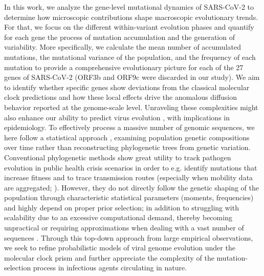 In this work, we analyze the gene-level mutational dynamics of SARS-CoV-2 to determine how microscopic contributions shape macroscopic evolutionary trends. For that, we focus on the different within-variant evolution phases and quantify for each gene the process of mutation accumulation and the generation of variability. More specifically, we calculate the mean number of accumulated mutations, the mutational variance of the population, and the frequency of each mutation to provide a comprehensive evolutionary picture for each of the 27 genes of SARS-CoV-2 \cite{yang2021structural} (ORF3b and ORF9c were discarded in our study). We aim to identify whether specific genes show deviations from the classical molecular clock predictions and how these local effects drive the anomalous diffusion behavior reported at the genome-scale level. Unraveling these complexities might also enhance our ability to predict virus evolution \cite{rouzine2001transition}, with implications in epidemiology. To effectively process a massive number of genomic sequences, we here follow a statistical approach \cite{obermeyer2022analysis,goiriz2023variant}, examining population genetic compositions over time rather than reconstructing phylogenetic trees from genetic variation. Conventional phylogenetic methods \cite{bouckaert2014beast} show great utility to track pathogen evolution in public health crisis scenarios in order to e.g. identify mutations that increase fitness and to trace transmission routes (especially when mobility data are aggregated; \cite{kraemer2021spatiotemporal}). However, they do not directly follow the genetic shaping of the population through characteristic statistical parameters (moments, frequencies) and highly depend on proper prior selection; in addition to struggling with scalability due to an excessive computational demand, thereby becoming unpractical or requiring approximations when dealing with a vast number of sequences \cite{demaio2023maximum}. Through this top-down approach from large empirical observations, we seek to refine probabilistic models of viral genome evolution under the molecular clock prism and further appreciate the complexity of the mutation-selection process in infectious agents circulating in nature.

